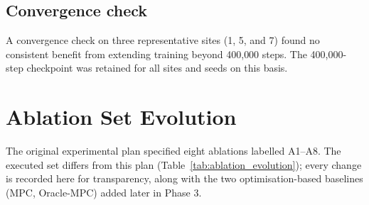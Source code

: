 \subsection{Convergence check}

A convergence check on three representative sites (1, 5, and 7) found no
consistent benefit from extending training beyond 400{,}000 steps.
The 400{,}000-step checkpoint was retained for all sites and seeds on
this basis.


\section{Ablation Set Evolution}
\label{sec:ablation_evolution}

The original experimental plan specified eight ablations labelled
A1--A8. The executed set differs from this plan
(Table~\ref{tab:ablation_evolution}); every change is recorded here for
transparency, along with the two optimisation-based baselines (MPC,
Oracle-MPC) added later in Phase 3.

